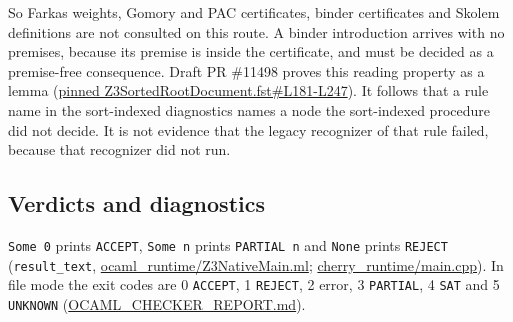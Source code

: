 \documentclass[10pt,a4paper]{article}
\begin{document}
So Farkas weights, Gomory and PAC certificates, binder certificates and Skolem definitions are not consulted on this route. A binder introduction arrives with no premises, because its premise is inside the certificate, and must be decided as a premise-free consequence. Draft PR \#11498 proves this reading property as a lemma (\href{https://github.com/Z3Prover/z3/blob/497dc106537fadc7633f78d9c91ac4dbfd7baf4b/fstar/Z3SortedRootDocument.fst\#L181-L247}{pinned Z3SortedRootDocument.fst\#L181-L247}). It follows that a rule name in the sort-indexed diagnostics names a node the sort-indexed procedure did not decide. It is not evidence that the legacy recognizer of that rule failed, because that recognizer did not run.

\subsection{Verdicts and diagnostics}\label{sec:36-verdicts-and-diagnostics}

\texttt{Some 0} prints \texttt{ACCEPT}, \texttt{Some n} prints \texttt{PARTIAL n} and \texttt{None} prints \texttt{REJECT} (\texttt{result\_\allowbreak{}text}, \href{https://github.com/Z3Prover/z3/blob/8fbb275aba0472e862e289c7af1331b3bd5d512c/fstar/ocaml_runtime/Z3NativeMain.ml\#L201-L204}{ocaml\_\allowbreak{}runtime/\allowbreak{}Z3Native\allowbreak{}Main.\allowbreak{}ml}; \href{https://github.com/Z3Prover/z3/blob/8fbb275aba0472e862e289c7af1331b3bd5d512c/fstar/cherry_runtime/main.cpp\#L357-L358}{cherry\_\allowbreak{}runtime/\allowbreak{}main.\allowbreak{}cpp}). In file mode the exit codes are 0 \texttt{ACCEPT}, 1 \texttt{REJECT}, 2 error, 3 \texttt{PARTIAL}, 4 \texttt{SAT} and 5 \texttt{UNKNOWN} (\href{https://github.com/Z3Prover/z3/blob/8fbb275aba0472e862e289c7af1331b3bd5d512c/fstar/OCAML_CHECKER_REPORT.md\#L2444-L2451}{OCAML\_\allowbreak{}CHECKER\_\allowbreak{}REPORT.\allowbreak{}md}).
\end{document}
